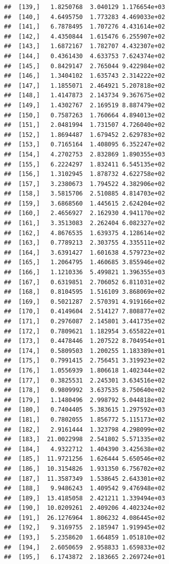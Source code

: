 \documentclass[article]{jss}\usepackage[]{graphicx}\usepackage[]{xcolor}
\makeatletter
\newenvironment{kframe}{%
 \def\at@end@of@kframe{}%
 \ifinner\ifhmode%
  \def\at@end@of@kframe{\end{minipage}}%
  \begin{minipage}{\columnwidth}%
 \fi\fi%
 \def\FrameCommand##1{\hskip\@totalleftmargin \hskip-\fboxsep
 \colorbox{shadecolor}{##1}\hskip-\fboxsep
     \hskip-\linewidth \hskip-\@totalleftmargin \hskip\columnwidth}%
 \MakeFramed {\advance\hsize-\width
   \@totalleftmargin\z@ \linewidth\hsize
   \@setminipage}}%
 {\par\unskip\endMakeFramed%
 \at@end@of@kframe}
\newenvironment{knitrout}{}{} %
\makeatother
\begin{document}
\begin{knitrout}
\begin{kframe}
\begin{verbatim}
##  [139,]   1.8250768  3.040129 1.176654e+03
##  [140,]   4.6495750  1.773283 4.469033e+02
##  [141,]   6.7878495  1.707276 4.431614e+02
##  [142,]   4.4350844  1.615476 6.255907e+02
##  [143,]   1.6872167  1.782707 4.432307e+02
##  [144,]   0.4361430  4.633753 7.624374e+02
##  [145,]   0.8429147  2.765044 9.422984e+02
##  [146,]   1.3404102  1.635743 2.314222e+02
##  [147,]   1.1855071  2.464921 5.207818e+02
##  [148,]   1.4147873  2.143734 9.367675e+02
##  [149,]   1.4302767  2.169519 8.887479e+02
##  [150,]   0.7587263  1.760664 4.894013e+02
##  [151,]   2.0481994  1.731507 4.726040e+02
##  [152,]   1.8694487  1.679452 2.629783e+02
##  [153,]   0.7165164  1.408095 6.352247e+02
##  [154,]   4.2702753  2.832869 1.890355e+03
##  [155,]   6.2224297  1.832411 6.545135e+02
##  [156,]   1.3102945  1.878732 4.622758e+02
##  [157,]   3.2380673  1.794522 4.382906e+02
##  [158,]   3.5815706  2.510885 4.814703e+02
##  [159,]   3.6868560  1.445615 2.624204e+02
##  [160,]   2.4656927  2.162930 4.941170e+02
##  [161,]   3.3513083  2.262404 6.082327e+02
##  [162,]   4.8676535  1.639375 4.128614e+02
##  [163,]   0.7789213  2.303755 4.335511e+02
##  [164,]   3.6391427  1.601638 4.579723e+02
##  [165,]   1.2064795  1.460685 3.855946e+02
##  [166,]   1.1210336  5.499821 1.396355e+03
##  [167,]   0.6319851  2.706052 6.811031e+02
##  [168,]   0.8104595  1.516109 3.868069e+02
##  [169,]   0.5021287  2.570391 4.919166e+02
##  [170,]   0.4149604  2.514127 7.808877e+02
##  [171,]   0.2976087  2.145801 3.441735e+02
##  [172,]   0.7809621  1.182954 3.655822e+01
##  [173,]   0.4478446  1.207522 8.704954e+01
##  [174,]   0.5809503  1.200255 1.183389e+01
##  [175,]   0.7991415  2.756451 3.319923e+02
##  [176,]   1.0556939  1.806618 1.402344e+02
##  [177,]   0.3825531  2.245301 3.634516e+02
##  [178,]   0.9809992  3.637535 8.750640e+02
##  [179,]   1.1480496  2.998792 5.044818e+02
##  [180,]   0.7404405  5.383615 1.297592e+03
##  [181,]   0.7802055  1.856772 5.115173e+02
##  [182,]   2.9161444  1.323798 4.298099e+02
##  [183,]  21.0022998  2.541802 5.571335e+02
##  [184,]   4.9322712  1.404390 3.425638e+02
##  [185,]  11.9721256  1.626444 5.650546e+02
##  [186,]  10.3154826  1.931350 6.756702e+02
##  [187,]  11.3587349  1.538645 2.643301e+02
##  [188,]   9.9486243  1.409542 9.476948e+02
##  [189,]  13.4185058  2.421211 1.339494e+03
##  [190,]  10.0209261  2.409206 4.402324e+02
##  [191,]  26.1276964  1.806232 4.086445e+02
##  [192,]   9.3169755  2.185947 1.919945e+02
##  [193,]   5.2358620  1.664859 1.051810e+02
##  [194,]   2.6050659  2.958833 1.659833e+02
##  [195,]   6.1743872  2.183665 2.269724e+01

\end{verbatim}
\end{kframe}
\end{knitrout}
\end{document}
